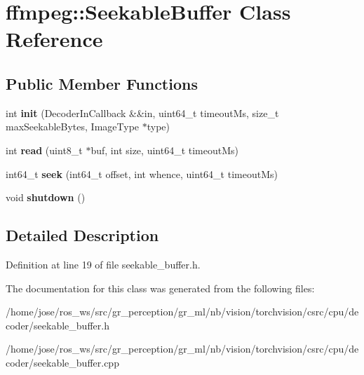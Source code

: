 \hypertarget{classffmpeg_1_1SeekableBuffer}{}\section{ffmpeg\+:\+:Seekable\+Buffer Class Reference}
\label{classffmpeg_1_1SeekableBuffer}
\subsection*{Public Member Functions}
\begin{DoxyCompactItemize}
\item 
\mbox{\label{classffmpeg_1_1SeekableBuffer_aab8784b1f4d740e4a636cefa1867ce6b}} 
int {\bfseries init} (Decoder\+In\+Callback \&\&in, uint64\+\_\+t timeout\+Ms, size\+\_\+t max\+Seekable\+Bytes, Image\+Type $\ast$type)
\item 
\mbox{\label{classffmpeg_1_1SeekableBuffer_ab0002664e592d425976d2138736a4844}} 
int {\bfseries read} (uint8\+\_\+t $\ast$buf, int size, uint64\+\_\+t timeout\+Ms)
\item 
\mbox{\label{classffmpeg_1_1SeekableBuffer_a3112df4fa1c082c684a2cc913fc79bea}} 
int64\+\_\+t {\bfseries seek} (int64\+\_\+t offset, int whence, uint64\+\_\+t timeout\+Ms)
\item 
\mbox{\label{classffmpeg_1_1SeekableBuffer_a760f69f15ba40c6a44b4fb454bafd427}} 
void {\bfseries shutdown} ()
\end{DoxyCompactItemize}


\subsection{Detailed Description}


Definition at line 19 of file seekable\+\_\+buffer.\+h.



The documentation for this class was generated from the following files\+:\begin{DoxyCompactItemize}
\item 
/home/jose/ros\+\_\+ws/src/gr\+\_\+perception/gr\+\_\+ml/nb/vision/torchvision/csrc/cpu/decoder/seekable\+\_\+buffer.\+h\item 
/home/jose/ros\+\_\+ws/src/gr\+\_\+perception/gr\+\_\+ml/nb/vision/torchvision/csrc/cpu/decoder/seekable\+\_\+buffer.\+cpp\end{DoxyCompactItemize}
